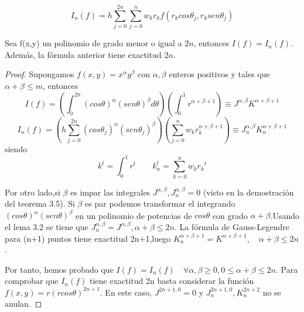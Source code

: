 $$ I_n(f) = h\sum_{j=0}^{2n}\sum_{j=0}^{n} w_k r_k f(r_k cos\theta_j,r_ksen\theta_j)$$
\begin{thm}Sea f(x,y) un polinomio de grado menor o igual a $2n$, entonces $I(f)=I_n(f)$. Además, la fórmula anterior tiene exactitud $2n$. 
\end{thm}
\begin{proof}
	Supongamos $f(x,y)=x^\alpha y^\beta$ con  $\alpha,\beta$ enteros positivos y tales que  $\alpha+\beta \le m$, entonces
	$$
	I(f)=\left(\int_{0}^{2\pi}(cos\theta)^{\alpha}(sen\theta)^{\beta}d\theta\right)\left(\int_{0}^{1}r^{\alpha+\beta +1}\right) \equiv J^{\alpha,\beta}K^{ \alpha+\beta+1 }
	$$
	$$
	I_n(f) = \left(h\sum_{j=0}^{2n}(cos\theta_j)^{\alpha}(sen\theta_j)^{\beta}\right) \left(\sum_{j=0}^{n}w_kr_k^{\alpha+\beta+1}\right)\equiv J_n^{\alpha,\beta}K_n^{ \alpha+\beta+1 }
	$$
	siendo
	$$
	k^t = \int_{0}^{1 } r^t \qquad k_n^t=\sum_{k=0}^{n} w_k{r_k}^t
	$$
	
	Por otro lado,si $\beta$ es impar las integrales $J^{\alpha,\beta},J_n^{\alpha,\beta}=0$ (visto en la demostración del teorema 3.5). Si $\beta$ es par podemos transformar el integrando $(cos \theta)^\alpha(sen\theta)^\beta$ en un polinomio de potencias de $cos \theta$ con grado $\alpha+\beta$.Usando el lema 3.2 se tiene que $J_n^{\alpha,\beta} = J^{\alpha,\beta}, \alpha+\beta\le 2n$. 
	\medskip
	La fórmula de Gauss-Legendre para (n+1) puntos tiene exactitud 2n+1,luego $K_n^{ \alpha+\beta+1 }=K^{ \alpha+\beta+1 }, \quad \alpha+\beta \le 2n$.
	\medskip
	
	Por tanto, hemos probado que $I(f) = I_n(f) \quad \forall \alpha,\beta\ge 0, 0\le\alpha+\beta \le 2n $.
	Para comprobar que $I_n(f)$ tiene exactitud 2n basta considerar la función $f(x,y) = r(rcos\theta)^{2n+1}$. En este caso, $J^{2n+1,0}=0$ y $J_n^{2n+1,0},K_n^{2n+2}$ no se anulan.
\end{proof}